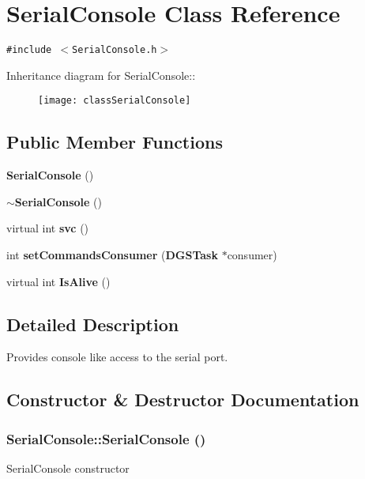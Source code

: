 \section{Serial\-Console Class Reference}
\label{classSerialConsole}
{\tt \#include $<$Serial\-Console.h$>$}

Inheritance diagram for Serial\-Console::\begin{figure}[H]
\begin{center}
\leavevmode
\texttt{[image: classSerialConsole]}
\end{center}
\end{figure}
\subsection*{Public Member Functions}
\begin{CompactItemize}
\item 
{\bf Serial\-Console} ()
\item 
{\bf $\sim$Serial\-Console} ()
\item 
virtual int {\bf svc} ()
\item 
int {\bf set\-Commands\-Consumer} ({\bf DGSTask} $\ast$consumer)
\item 
virtual int {\bf Is\-Alive} ()
\end{CompactItemize}


\subsection{Detailed Description}
Provides console like access to the serial port. 



\subsection{Constructor \& Destructor Documentation}
\subsubsection{\setlength{\rightskip}{0pt plus 5cm}Serial\-Console::Serial\-Console ()}\label{classSerialConsole_a0}


Serial\-Console constructor 
